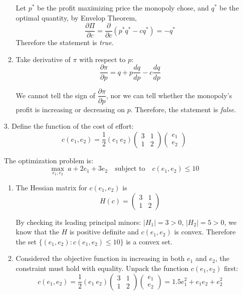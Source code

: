 \documentclass{article}
\begin{document}
\begin{enumerate}
\begin{enumerate}
            Let $p^*$ be the profit maximizing price the monopoly chose, and $q^*$ be the optimal quantity, by Envelop Theorem, 
            $$ \frac{\partial \Pi}{\partial c} = \frac{\partial}{\partial c}( p^*q^* - cq^* ) = -q^* $$
            Therefore the statement is \emph{true}. \\
            
            \item Take derivative of $\pi$ with respect to $p$:
            $$ \frac{\partial \pi}{\partial p} = q + p\frac{dq}{dp} - c\frac{dq}{dp} $$
            
            We cannot tell the sign of $\dfrac{\partial \pi}{\partial p}$, nor we can tell whether 
            the monopoly's profit is increasing or decreasing on $p$. Therefore, the statement 
            is \emph{false}. \\
        \end{enumerate}
        
    
    \item[3. ] Define the function of the cost of effort:
    $$ c(e_1,e_2) = \frac{1}{2}(e_1\ e_2) \begin{pmatrix} 3 & 1 \\ 1 & 2 \end{pmatrix}\begin{pmatrix} e_1 \\ e_2 \end{pmatrix} $$
    
    The optimization problem is:
    $$\underset{e_1,e_2}{\max}\ a + 2e_1 + 3e_2\quad \textrm{subject to}\quad c(e_1,e_2) \leq 10 $$
    \begin{enumerate}
        \item The Hessian matrix for $c(e_1, e_2)$ is 
        $$ H(c) = \begin{pmatrix} 3 & 1 \\ 1 & 2 \end{pmatrix} $$
        
        By checking its leading principal minors: $ |H_1| = 3 > 0$, $ |H_2| = 5 > 0$, we know that 
        the $H$ is positive definite and $c(e_1, e_2)$ is convex. Therefore the set 
        $ \{ (e_1,e_2): c(e_1,e_2) \leq 10 \}$ is a convex set. \\
        
        \item Considered the objective function in increasing in both $e_1$ and $e_2$, the constraint must hold with equality. Unpack the function $c(e_1,e_2)$ first:
        $$ c(e_1,e_2) = \frac{1}{2}(e_1\ e_2) \begin{pmatrix} 3 & 1 \\ 1 & 2 \end{pmatrix}\begin{pmatrix} e_1 \\ e_2 \end{pmatrix} = 1.5e_1^2 + e_1e_2 + e_2^2 $$ 
        

\end{enumerate}
\end{enumerate}
\end{document}
